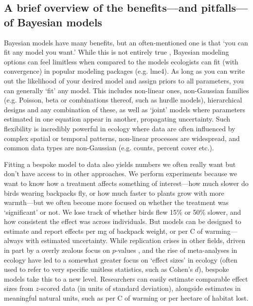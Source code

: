 \documentclass[11pt]{article}
\begin{document}
{%

\subsection{A brief overview of the benefits---and pitfalls---of Bayesian models} 

Bayesian models have many benefits, but an often-mentioned one is that `you can fit any model you want.' While this is not entirely true \citep{BDA,reid2019}, Bayesian modeling options can feel limitless when compared to the models ecologists can fit (with convergence) in popular modeling packages (e.g. \textsf{lme4}). As long as you can write out the likelihood of your desired model and assign priors to all parameters, you can generally `fit' any model. This includes non-linear ones, non-Gaussian families (e.g. Poisson, beta or combinations thereof, such as hurdle models), hierarchical designs and any combination of these, as well as `joint' models where parameters estimated in one equation appear in another, propagating uncertainty. Such flexibility is incredibly powerful in ecology where data are often influenced by complex spatial or temporal patterns, non-linear processes are widespread, and common data types are non-Gaussian (e.g. counts, percent cover etc.). 

Fitting a bespoke model to data also yields numbers we often really want but don't have access to in other approaches. We perform experiments because we want to know how a treatment affects something of interest---how much slower do birds wearing backpacks fly, or how much faster to plants grow with more warmth---but we often become more focused on whether the treatment was `significant' or not. We lose track of whether birds flew 15\% or 50\% slower, and how consistent the effect was across individuals. But models can be designed to estimate and report effects per mg of backpack weight, or per \degree C of warming---always with estimated uncertainty. While replication crises in other fields, driven in part by a overly zealous focus on $p$-values \citep{halsey2015,loken2017}, and the rise of meta-analyses in ecology \citep{Hampton2013} have led to a somewhat greater focus on `effect sizes' in ecology (often used to refer to very specific unitless statistics, such as Cohen's $d$), bespoke models take this to a new level. Researchers can easily estimate comparable effect sizes from $z$-scored data (in units of standard deviation), alongside estimates in meaningful natural units, such as per \degree C of warming or per hectare of habitat lost.

}
\end{document}
